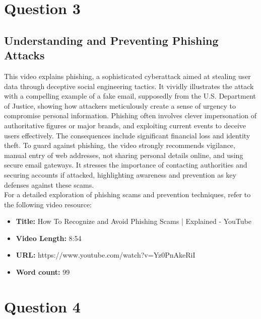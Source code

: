 \documentclass[12pt,a4paper]{article}
\begin{document}
\setcounter{page}{4}

\section{Question 3}
\subsection{Understanding and Preventing Phishing Attacks}
\label{sec:Question 3}
\nocite{question_3.1}

\noindent This video explains phishing, a sophisticated cyberattack aimed at stealing user data through deceptive social engineering tactics. It vividly illustrates the attack with a compelling example of a fake email, supposedly from the U.S. Department of Justice, showing how attackers meticulously create a sense of urgency to compromise personal information. Phishing often involves clever impersonation of authoritative figures or major brands, and exploiting current events to deceive users effectively. The consequences include significant financial loss and identity theft. To guard against phishing, the video strongly recommends vigilance, manual entry of web addresses, not sharing personal details online, and using secure email gateways. It stresses the importance of contacting authorities and securing accounts if attacked, highlighting awareness and prevention as key defenses against these scams.\\

\noindent For a detailed exploration of phishing scams and prevention techniques, refer to the following video resource:

\begin{itemize}[leftmargin=*]
    \item \textbf{Title:} How To Recognize and Avoid Phishing Scams | Explained - YouTube
    \item \textbf{Video Length:} 8:54
    \item \textbf{URL:} https://www.youtube.com/watch?v=Yz0PnAkeRiI
    \item \textbf{Word count:} 99
\end{itemize}

\pagebreak


\setcounter{page}{5}
\section{Question 4}
\end{document}
